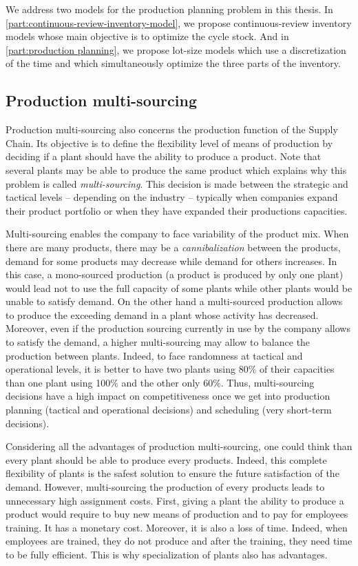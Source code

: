 \medskip


We address two models for the production planning problem in this thesis.
In \cref{part:continuous-review-inventory-model}, we propose continuous-review inventory models whose main objective is to optimize the cycle stock.
And in \cref{part:production planning}, we propose lot-size models which use a discretization of the time and which simultaneously optimize the three parts of the inventory.


\subsection{Production multi-sourcing}
\label{sec:business-context:argon:multi-sourcing}


Production multi-sourcing also concerns the production function of the Supply Chain.
Its objective is to define the flexibility level of means of production by deciding if a plant should have the ability to produce a product.
Note that several plants may be able to produce the same product which explains why this problem is called \emph{multi-sourcing}.
This decision is made between the strategic and tactical levels -- depending on the industry -- typically when companies expand their product portfolio or when they have expanded their productions capacities.


Multi-sourcing enables the company to face variability of the product mix.
When there are many products, there may be a \emph{cannibalization} between the products, \ie demand for some products may decrease while demand for others increases.
In this case, a mono-sourced production (\ie a product is produced by only one plant) would lead not to use the full capacity of some plants while other plants would be unable to satisfy demand.
On the other hand a multi-sourced production allows to produce the exceeding demand in a plant whose activity has decreased.
Moreover, even if the production sourcing currently in use by the company allows to satisfy the demand, a higher multi-sourcing may allow to balance the production between plants.
Indeed, to face randomness at tactical and operational levels, it is better to have two plants using 80\% of their capacities than one plant using 100\% and the other only 60\%. 
Thus, multi-sourcing decisions have a high impact on competitiveness once we get into production planning (tactical and operational decisions) and scheduling (very short-term decisions).


Considering all the advantages of production multi-sourcing, one could think than every plant should be able to produce every products.
Indeed, this complete flexibility of plants is the safest solution to ensure the future satisfaction of the demand.
However, multi-sourcing the production of every products leads to unnecessary high assignment costs.
First, giving a plant the ability to produce a product would require to buy new means of production and to pay for employees training.
It has a monetary cost.
Moreover, it is also a loss of time.
Indeed, when employees are trained, they do not produce and after the training, they need time to be fully efficient.
This is why specialization of plants also has advantages.


